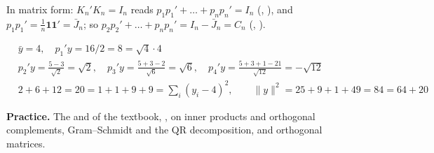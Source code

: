 \documentclass[12pt]{article}
\newcommand{\one}{\mathbf 1}
\theoremstyle{definition}
\newcommand{\boardtop}{\vspace*{-\abovedisplayskip}}
\begin{document}
In matrix form: \(K_n'K_n=I_n\) reads \(p_1p_1'+\dots+p_np_n'=I_n\) (, ), and
\(p_1p_1'=\frac1n\one\one'=\bar J_n\); so \(p_2p_2'+\dots+p_np_n'=I_n-\bar J_n=C_n\) (, ).
\begin{board}[(c) \(n=4\), \(y=(5,3,1,7)'\):]
\boardtop
\begin{align*}
&\bar y=4,\quad p_1'y=16/2=8=\sqrt4\cdot4\\
&p_2'y=\frac{5-3}{\sqrt2}=\sqrt2,\quad p_3'y=\frac{5+3-2}{\sqrt6}=\sqrt6,\quad p_4'y=\frac{5+3+1-21}{\sqrt{12}}=-\sqrt{12}\\
&2+6+12=20=1+1+9+9=\textstyle\sum_i(y_i-4)^2,\qquad\lVert y\rVert^2=25+9+1+49=84=64+20
\end{align*}
\end{board}

\bigskip
\textbf{Practice.} The  and  of the textbook, , on inner products and orthogonal complements,
Gram--Schmidt and the QR decomposition, and orthogonal matrices.
\end{document}
